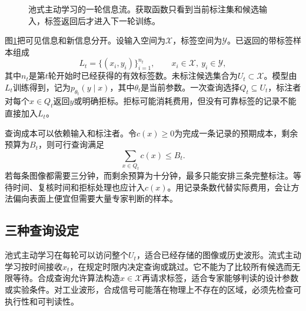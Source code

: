 \begin{figure}[htbp]
\centering
{}
\caption{池式主动学习的一轮信息流。获取函数只看到当前标注集和候选输入，标签返回后才进入下一轮训练。}
\label{fig:active-information-loop}
\end{figure}

图\ref{fig:active-information-loop}把可见信息和新信息分开。设输入空间为$\mathcal X$，标签空间为$\mathcal Y$。已返回的带标签样本组成
\begin{equation}
 L_t=\{(x_i,y_i)\}_{i=1}^{n_t},\qquad x_i\in\mathcal X,\ y_i\in\mathcal Y,
\end{equation}
其中$n_t$是第$t$轮开始时已经获得的有效标签数。未标注候选集合为$U_t\subset\mathcal X$。模型由$L_t$训练得到，记为$p_{\theta_t}(y\mid x)$，其中$\theta_t$是当前参数。一次查询选择$Q_t\subseteq U_t$，标注者对每个$x\in Q_t$返回$y$或明确拒标。拒标可能消耗费用，但没有可靠标签的记录不能直接加入$L_t$。

查询成本可以依赖输入和标注者。令$c(x)\geq0$为完成一条记录的预期成本，剩余预算为$B_t$，则可行查询满足
\begin{equation}
 \sum_{x\in Q_t}c(x)\leq B_t.
 \label{eq:active-budget}
\end{equation}
若每条图像都需要三分钟，而剩余预算为十分钟，最多只能安排三条完整标注。等待时间、复核时间和拒标处理也应计入$c(x)$。用记录条数代替实际费用，会让方法偏向表面上便宜但需要大量专家判断的样本。

\subsection{三种查询设定}

池式主动学习在每轮可以访问整个$U_t$，适合已经存储的图像或历史波形。流式主动学习按时间接收$x_t$，在规定时限内决定查询或跳过。它不能为了比较所有候选而无限等待。合成查询允许算法构造$x\in\mathcal X$再请求标签，适合专家能够判读的设计参数或实验条件。对工业波形，合成信号可能落在物理上不存在的区域，必须先检查可执行性和可判读性。

